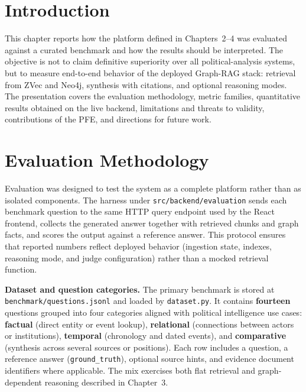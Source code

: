 

\section{Introduction}

This chapter reports how the platform defined in Chapters~2--4 was evaluated against a curated benchmark and how the results should be interpreted. The objective is not to claim definitive superiority over all political-analysis systems, but to measure end-to-end behavior of the deployed Graph-RAG stack: retrieval from ZVec and Neo4j, synthesis with citations, and optional reasoning modes. The presentation covers the evaluation methodology, metric families, quantitative results obtained on the live backend, limitations and threats to validity, contributions of the PFE, and directions for future work.

\section{Evaluation Methodology}

Evaluation was designed to test the system as a complete platform rather than as isolated components. The harness under \texttt{src/backend/evaluation} sends each benchmark question to the same HTTP query endpoint used by the React frontend, collects the generated answer together with retrieved chunks and graph facts, and scores the output against a reference answer. This protocol ensures that reported numbers reflect deployed behavior (ingestion state, indexes, reasoning mode, and judge configuration) rather than a mocked retrieval function.

\textbf{Dataset and question categories.} The primary benchmark is stored at \texttt{benchmark/questions.jsonl} and loaded by \texttt{dataset.py}. It contains \textbf{fourteen} questions grouped into four categories aligned with political intelligence use cases: \textbf{factual} (direct entity or event lookup), \textbf{relational} (connections between actors or institutions), \textbf{temporal} (chronology and dated events), and \textbf{comparative} (synthesis across several sources or positions). Each row includes a question, a reference answer (\texttt{ground\_truth}), optional source hints, and evidence document identifiers where applicable. The mix exercises both flat retrieval and graph-dependent reasoning described in Chapter~3.

